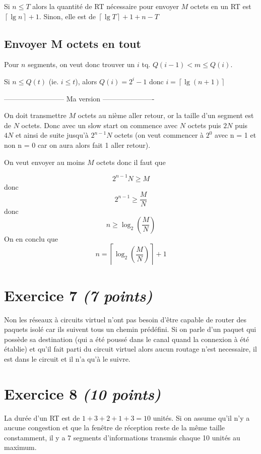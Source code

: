\documentclass{article}
\begin{document}
Si $n \leq T$ alors la quantité de RT nécessaire pour envoyer $M$ octets en un RT est $\left\lceil\lg{n}\right\rceil+1$.
Sinon, elle est de $\left\lceil\lg{T}\right\rceil + 1 + n - T$

\subsection{Envoyer M octets en tout}
Pour $n$ segments, on veut donc trouver un $i$ tq. $Q(i-1) < m \leq Q(i)$.

Si $n \leq Q(t)$ (ie. $i \leq t$), alors $Q(i) = 2^i - 1$ donc $i = \left\lceil\lg(n+1)\right\rceil$

\hfill

-------------------------- Ma version ----------------------

\hfill

On doit transmettre $M$ octets au nième aller retour, or la taille d'un segment est de $N$ octets. Donc avec un slow start on commence avec $N$ octets puis $2N$ puis $4N$ et ainsi de suite jusqu'à $2^{n-1}N$ octets (on veut commencer à $2^0$ avec n = 1 et non n = 0 car on aura alors fait 1 aller retour).

\hfill

On veut envoyer au moins $M$ octets donc il faut que 

$$ 2^{n-1} N \geqslant M  $$ donc $$ 2^{n-1} \geqslant \frac{M}{N} $$ donc $$ n \geqslant \log_2\left(\frac{M}{N}\right)$$
On en conclu que $$ n = \left\lceil \log_2\left(\frac{M}{N}\right)\right\rceil +1$$

\clearpage

\section{Exercice 7 \emph{(7 points)}}

Non les réseaux à circuits virtuel n'ont pas besoin d'être capable de router des paquets isolé car ils suivent tous un chemin prédéfini. Si on parle d'un paquet qui possède sa destination (qui a été poussé dans le canal quand la connexion à été établie) et qu'il fait parti du circuit virtuel alors aucun routage n'est necessaire, il est dans le circuit et il n'a qu'à le suivre.


\section{Exercice 8 \emph{(10 points)}}
La durée d'un RT est de $1 + 3 + 2 + 1 + 3 = 10$ unités. Si on assume qu'il n'y a aucune congestion et que la fenêtre de réception reste de la même taille constamment, il y a $7$ segments d'informations transmis chaque 10 unités au maximum.
\end{document}
